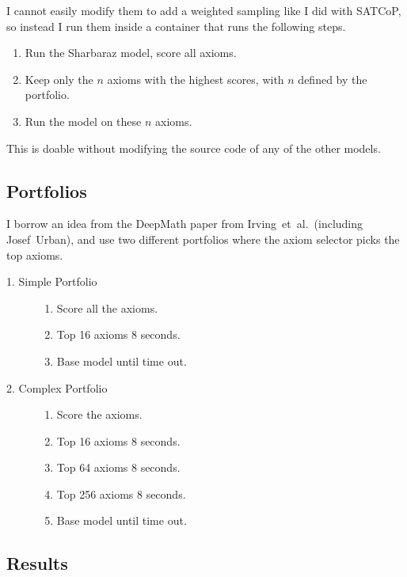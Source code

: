 \documentclass[10pt,a4paper,twocolumn]{article}
\newcommand{\cop}[1]{\textsf{#1}}
\begin{document}
I cannot easily modify them to add a weighted sampling like I did with \cop{SATCoP}, so instead I run them inside a container that runs the following steps.

\begin{enumerate}
	\item Run the \cop{Sharbaraz} model, score all axioms.
	\item Keep only the $n$ axioms with the highest scores, with $n$ defined by the portfolio.
	\item Run the model on these $n$ axioms.
\end{enumerate}

This is doable without modifying the source code of any of the other models.

\subsection{Portfolios}
\label{portfolios}

I borrow an idea from the DeepMath paper from Irving~et~al.\ (including Josef~Urban)\cite{deepmath}, and use two different portfolios where the axiom selector picks the top axioms.

\begin{description}
	\item[1. Simple Portfolio] \phantom{a}
		\begin{enumerate}[itemsep=-3pt]
			\item Score all the axioms.
			\item Top 16 axioms 8 seconds.
			\item Base model until time out.
		\end{enumerate}
	\item[2. Complex Portfolio] \phantom{b}
		\begin{enumerate}[itemsep=-3pt]
			\item Score the axioms.
			\item Top 16 axioms 8 seconds.
			\item Top 64 axioms 8 seconds.
			\item Top 256 axioms 8 seconds.
			\item Base model until time out.
		\end{enumerate}
\end{description}

\subsection{Results}
\end{document}
